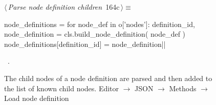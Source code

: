 \documentclass[%
    a4paper,    %
    justified,  %
    nobib,      %
    openany     %
]{tufte-book}
\makeatletter
\renewcommand{\label}[1]{\@tufte@label{##1}}%
\makeatother
\begin{document}
\begin{figure}[!htbp]
\begin{flushleft} \small
\begin{minipage}{\linewidth}\label{scrap128}\raggedright\small
{} $\langle\,${\itshape Parse node definition children}\nobreak\ {\footnotesize {164c}}$\,\rangle\equiv$
\vspace{-1ex}
\begin{pythoncode}
node_definitions = {}
for node_def in o['nodes']:
    definition_id, node_definition = cls.build_node_definition(
        node_def
    )
    node_definitions[definition_id] = node_definition|\NWsep|
\end{pythoncode}
\vspace{1.5ex}
\footnotesize
\begin{list}{}{\setlength{\itemsep}{-\parsep}\setlength{\itemindent}{-\leftmargin}}
\item \NWtxtMacroRefIn\ .

\item{}
\end{list}
\end{minipage}\vspace{4ex}
\end{flushleft}
\caption{The child nodes of a node definition are parsed and then added to
the list of known child nodes.
  \newline{}\newline{}Editor $\rightarrow$ JSON $\rightarrow$
  Methods $\rightarrow$ Load node definition}
\end{figure}
\end{document}

